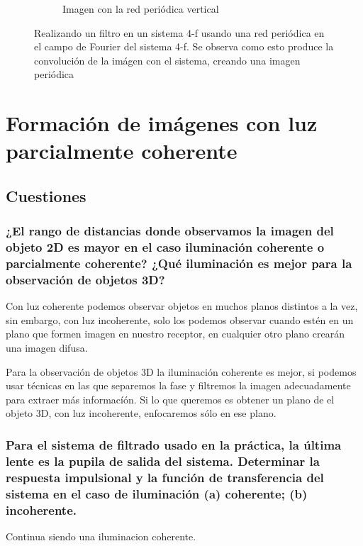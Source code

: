 \documentclass{./packages/optica-article}
\begin{document}
\begin{figure}[hptb]
\begin{center}
\begin{subfigure}[t]{0.3\textwidth}
			\caption{Imagen con la red periódica vertical}
			\label{fig:filtrado:talbot:3}
		\end{subfigure}
		\caption{Realizando un filtro en un sistema 4-f usando una red periódica en el campo de Fourier del sistema 4-f. Se observa como esto produce la convolución de la imágen con el sistema, creando una imagen periódica}
		\label{fig:filtrado:all}
	\end{center}
\end{figure}


\section{Formación de imágenes con luz parcialmente coherente}

\subsection{Cuestiones}
\subsubsection{¿El rango de distancias donde observamos la imagen del objeto 2D es mayor en el caso iluminación coherente o parcialmente coherente? ¿Qué iluminación es mejor para la observación de objetos 3D?}

Con luz coherente podemos observar objetos en muchos planos distintos a la vez, sin embargo, con luz incoherente, solo los podemos observar cuando estén en un plano que formen imagen en nuestro receptor, en cualquier otro plano crearán una imagen difusa.

Para la observación de objetos 3D la iluminación coherente es mejor, si podemos usar técnicas en las que separemos la fase y filtremos la imagen adecuadamente para extraer más informacíón. Si lo que queremos es obtener un plano de el objeto 3D, con luz incoherente, enfocaremos sólo en ese plano.

\subsubsection{Para el sistema de filtrado usado en la práctica, la última lente es la pupila de salida del sistema. Determinar la respuesta impulsional y la función de transferencia del sistema en el caso de iluminación (a) coherente; (b) incoherente.}

Continua siendo una iluminacion coherente.



\end{document}

